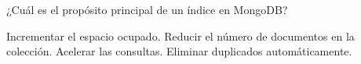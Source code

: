 \question[1] ¿Cuál es el propósito principal de un índice en MongoDB?
\begin{choices}
\choice Incrementar el espacio ocupado.
\choice Reducir el número de documentos en la colección.
\CorrectChoice Acelerar las consultas.
\choice Eliminar duplicados automáticamente.
\end{choices}